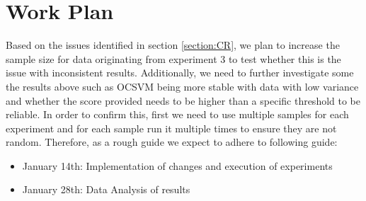 \documentclass{mprop}
\begin{document}
\section{Work Plan}


Based on the issues identified in section \ref{section:CR}, we plan to increase the sample size for data originating from experiment 3 to test whether this is the issue with inconsistent results. Additionally, we need to further investigate some the results above such as OCSVM being more stable with data with low variance and whether the score provided needs to be higher than a specific threshold to be reliable. In order to confirm this, first we need to use multiple samples for each experiment and for each sample run it multiple times to ensure they are not random. Therefore, as a rough guide we expect to adhere to following guide:

\begin{itemize}
    \item January 14th: Implementation of changes and execution of experiments
    \item January 28th: Data Analysis of results
\end{itemize}



\end{document}
